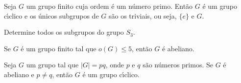\documentclass{beamer}
\begin{document}
    \begin{frame}
        \begin{corolario}
            Seja $G$ um grupo finito \pause cuja ordem é um n\'umero primo. \pause Então $G$ é um grupo c{\'\i}clico \pause e os \'unicos subgrupos de $G$ \pause são os triviais, \pause ou seja, $\{e\}$ e $G$.
        \end{corolario}
    \end{frame}

    \begin{frame}
        \begin{exemplo}
            Determine todos os subgrupos do grupo $S_3$.
        \end{exemplo}
    \end{frame}

    \begin{frame}
        \begin{proposicao}
            Se $G$ é um grupo finito tal que $o(G) \le 5$, então $G$ é abeliano.
        \end{proposicao}
    \end{frame}

    \begin{frame}
        \begin{proposicao}
            Seja $G$ um grupo tal que $|G| = pq$, onde $p$ e $q$ são n\'umeros primos. Se $G$ é abeliano e $p \ne q$, então $G$ é um grupo c{\'\i}clico.
        \end{proposicao}
    \end{frame}
\end{document}
